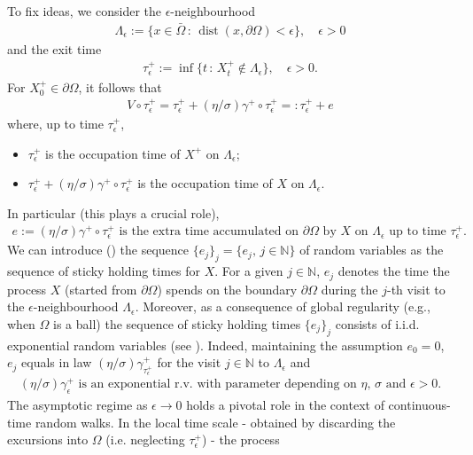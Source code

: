 \documentclass[10pt,a4paper]{article}
\numberwithin{equation}{section}
\theoremstyle{plain}
\theoremstyle{remark}
\begin{document}
To fix ideas, we consider the $\epsilon$-neighbourhood 
\begin{align*}
\Lambda_\epsilon := \{x \in \bar{\Omega}\,:\, \operatorname{dist}(x, \partial \Omega) < \epsilon\}, \quad \epsilon>0
\end{align*}
and the exit time
\begin{align*}
\tau^+_\epsilon := \inf\{ t\,:\, X^+_t \notin \Lambda_\epsilon  \}, \quad \epsilon>0.
\end{align*}
For $X^+_0 \in \partial \Omega$, it follows that      
\begin{align*}
V \circ \tau^+_\epsilon = \tau^+_\epsilon + (\eta/\sigma) \gamma^+ \circ \tau^+_\epsilon =: \tau^+_\epsilon + e
\end{align*}
where, up to time $\tau^+_\epsilon$, 
\begin{itemize}
\item[i)] $\tau^+_\epsilon$ is the occupation time of $X^+$ on $\Lambda_\epsilon$;
\item[ii)] $\tau^+_\epsilon + (\eta/\sigma) \gamma^+ \circ \tau^+_\epsilon$ is the occupation time of $X$ on $\Lambda_\epsilon$.
\end{itemize}
In particular (this plays a crucial role),
\begin{align*}
\textrm{$e:=(\eta/\sigma) \gamma^+ \circ \tau^+_\epsilon$ is the extra time accumulated on $\partial \Omega$ by $X$ on $\Lambda_\epsilon$ up to time $\tau^+_\epsilon$.}
\end{align*}
We can introduce (\cite[Definition 6.3]{EJP}) the sequence $\{e_j\}_j = \{e_j,\, j \in \mathbb{N}\}$ of random variables as the sequence of sticky holding times for $X$. For a given $j \in \mathbb{N}$, $e_j$ denotes the time the process $X$ (started from $\partial \Omega$) spends on the boundary $\partial \Omega$ during the $j$-th visit to the $\epsilon$-neighbourhood $\Lambda_\epsilon$. Moreover, as a consequence of global regularity (e.g., when $\Omega$ is a ball) the sequence of sticky holding times $\{e_j\}_j$ consists of i.i.d. exponential random variables (see \cite[Remark 6.4 and Remark 6.5]{EJP}). Indeed, maintaining the assumption $e_0=0$, $e_j$ equals in law $(\eta/\sigma) \gamma^+_{\tau^+_\epsilon}$ for the visit $j \in \mathbb{N}$ to $\Lambda_\epsilon$ and
\begin{align*}
\textrm{$(\eta/\sigma) \gamma^+_\epsilon$ is an exponential r.v. with parameter depending on $\eta$, $\sigma$ and $\epsilon>0$.}
\end{align*}
The asymptotic regime as $\epsilon\to 0$ holds a pivotal role in the context of continuous-time random walks. In the local time scale - obtained by discarding the excursions into $\Omega$ (i.e. neglecting $\tau^+_\epsilon$) - the process
\end{document}
